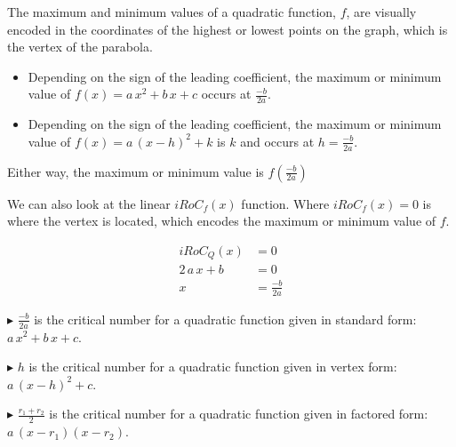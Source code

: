 \documentclass{ximera}
\begin{document}
The maximum and minimum values of a quadratic function, $f$, are visually encoded in the coordinates of the highest or lowest points on the  graph, which is the vertex of the parabola.


\begin{itemize}
     \item Depending on the sign of the leading coefficient, the maximum or minimum value of $f(x) = a \, x^2 + b \, x + c$ occurs at $\frac{-b}{2a}$. 


     \item Depending on the sign of the leading coefficient, the maximum or minimum value of $f(x) = a \, (x - h)^2 + k$ is $k$ and occurs at $h = \frac{-b}{2a}$. 
\end{itemize}

Either way, the maximum or minimum value is $f\left( \frac{-b}{2a} \right)$




We can also look at the linear $iRoC_f(x)$ function.  Where $iRoC_f(x) = 0$ is where the vertex is located, which encodes the maximum or minimum value of $f$.





\begin{align*}
iRoC_Q(x)       &= 0  \\
2 \, a \, x + b  & = 0  \\
x     &=  \frac{-b}{2a}
\end{align*}




\textbf{\textcolor{blue!55!black}{$\blacktriangleright$}}  $\frac{-b}{2a}$ is the critical number for a quadratic function given in standard form: $a \, x^2 + b \, x + c$.



\textbf{\textcolor{blue!55!black}{$\blacktriangleright$}}  $h$ is the critical number for a quadratic function given in vertex form: $a \, (x - h)^2 + c$.



\textbf{\textcolor{blue!55!black}{$\blacktriangleright$}}  $\frac{r_1 + r_2}{2}$ is the critical number for a quadratic function given in factored form: $a \, (x - r_1) (x - r_2)$.
\end{document}
